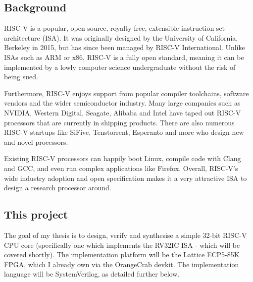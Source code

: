 \documentclass{article}
\begin{document}



\subsection{Background}
RISC-V is a popular, open-source, royalty-free, extensible instruction set architecture (ISA). It was
originally designed by the University of California, Berkeley in 2015, but has since been managed by RISC-V
International. Unlike ISAs such as ARM or x86, RISC-V is a fully open standard, meaning it can be implemented
by a lowly computer science undergraduate without the risk of being sued.

Furthermore, RISC-V enjoys support from popular compiler toolchains, software vendors and the wider
semiconductor industry. Many large companies such as NVIDIA, Western Digital, Seagate, Alibaba and Intel have
taped out RISC-V processors that are currently in shipping products. There are also numerous RISC-V startups
like SiFive, Tenstorrent, Esperanto and more who design new and novel processors.

Existing RISC-V processors can happily boot Linux, compile code with Clang and GCC, and even run complex
applications like Firefox. Overall, RISC-V's wide industry adoption and open specification makes it a very
attractive ISA to design a research processor around.

\subsection{This project}
The goal of my thesis is to design, verify and synthesise a simple 32-bit RISC-V CPU core (specifically one
which implements the RV32IC ISA - which will be covered shortly). The implementation platform will be the
Lattice ECP5-85K FPGA, which I already own via the OrangeCrab devkit. The implementation language will be
SystemVerilog, as detailed further below.
\end{document}
